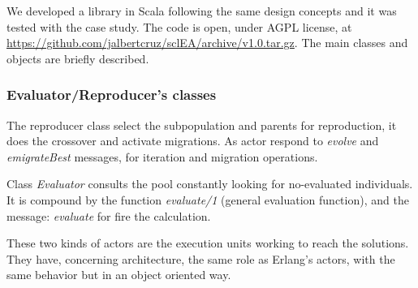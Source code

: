 
We developed a library in Scala following the same design concepts and it was tested with the case study. The code is open, under AGPL license, at
\url{https://github.com/jalbertcruz/sclEA/archive/v1.0.tar.gz}. The main classes and objects are briefly described.
\subsubsection{Evaluator/Reproducer's classes}

The reproducer class select the subpopulation and parents for reproduction, it does the crossover and activate migrations. As actor respond to {\em evolve} and {\em emigrateBest} messages, for iteration and migration operations.

Class {\em Evaluator} consults the pool constantly looking for no-evaluated individuals. It is compound by the function {\em evaluate/1} (general evaluation function), and the message: {\em evaluate} for fire the calculation.

These two kinds of actors are the execution units working to reach the solutions. They have, concerning architecture, the same role as Erlang’s actors, with the same behavior but in an object oriented way.
